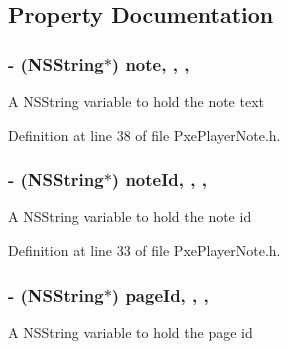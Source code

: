 \subsection{Property Documentation}
\hypertarget{interface_pxe_player_note_a07b8365c14b56d5f6bbf991246600880}{
\subsubsection[{note}]{\setlength{\rightskip}{0pt plus 5cm}-\/ (N\-S\-String$\ast$) note\hspace{0.3cm}{\ttfamily [read]}, {\ttfamily [write]}, {\ttfamily [nonatomic]}, {\ttfamily [strong]}}}\label{interface_pxe_player_note_a07b8365c14b56d5f6bbf991246600880}
A N\-S\-String variable to hold the note text 

Definition at line 38 of file Pxe\-Player\-Note.\-h.

\hypertarget{interface_pxe_player_note_a105bbfb4b9f6c08dfb1a1858f511583e}{
\subsubsection[{note\-Id}]{\setlength{\rightskip}{0pt plus 5cm}-\/ (N\-S\-String$\ast$) note\-Id\hspace{0.3cm}{\ttfamily [read]}, {\ttfamily [write]}, {\ttfamily [nonatomic]}, {\ttfamily [strong]}}}\label{interface_pxe_player_note_a105bbfb4b9f6c08dfb1a1858f511583e}
A N\-S\-String variable to hold the note id 

Definition at line 33 of file Pxe\-Player\-Note.\-h.

\hypertarget{interface_pxe_player_note_ae601c2f7024f6c8a478ff0daddb9618b}{
\subsubsection[{page\-Id}]{\setlength{\rightskip}{0pt plus 5cm}-\/ (N\-S\-String$\ast$) page\-Id\hspace{0.3cm}{\ttfamily [read]}, {\ttfamily [write]}, {\ttfamily [nonatomic]}, {\ttfamily [strong]}}}\label{interface_pxe_player_note_ae601c2f7024f6c8a478ff0daddb9618b}
A N\-S\-String variable to hold the page id 


